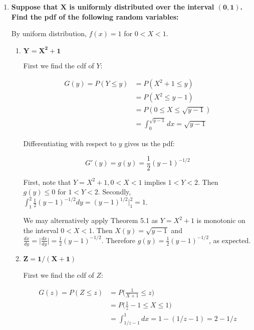 \documentclass[10pt, oneside]{article}   	%
\theoremstyle{definition}
\begin{document}
\begin{enumerate}[label=5.\arabic*]
\item  \begin{tcolorbox}[
  colback=Cerulean!5!white,
  colframe=Cerulean!75!black]
\textbf{Suppose that $\bm{X}$ is uniformly distributed over the interval $\bm{(0,1)}$. Find the pdf of the following random variables:}
\end{tcolorbox}

By uniform distribution, $f(x) = 1$ for $0 < X < 1$.

	\begin{enumerate}
	\item  \begin{tcolorbox}[
	  colback=Cerulean!5!white,
	  colframe=Cerulean!75!black]
	\textbf{$\bm{Y = X^2 + 1}$}
	\end{tcolorbox}
	
	First we find the cdf of $Y$:
	
	\begin{align*}
	G(y) = P(Y \leq y) &= P(X^2 + 1 \leq y) \\
	&= P(X^2 \leq y - 1) \\
	&= P(0 \leq X \leq \sqrt{y-1}) \\
	&= \int^{\sqrt{y-1}}_0 dx = \sqrt{y-1}
	\end{align*}
	
	Differentiating with respect to $y$ gives us the pdf:
	
	\[ G'(y) = g(y) = \boxed{ \frac{1}{2} (y - 1)^{-1/2} } \]
	
	First, note that $Y = X^2 + 1, 0 < X < 1$ implies $1 < Y < 2$. Then $g(y) \leq 0$ for $1 < Y < 2$. Secondly, $\int^2_1 \frac{1}{2} (y-1)^{-1/2} dy = (y-1)^{1/2} \big|^2_1 = \boxed{1}$.
	
	We may alternatively apply Theorem 5.1 as $Y = X^2 + 1$ is monotonic on the interval $0 < X < 1$. Then $X(y) = \sqrt{y - 1}$ and $\frac{dx}{dy} = \big| \frac{dx}{dy} \big| = \frac{1}{2} (y-1)^{-1/2}$. Therefore $g(y) = \frac{1}{2} (y-1)^{-1/2}$, as expected.
	
	\item  \begin{tcolorbox}[
	  colback=Cerulean!5!white,
	  colframe=Cerulean!75!black]
	\textbf{$\bm{Z = 1 / (X + 1)}$}
	\end{tcolorbox}
	
	First we find the cdf of $Z$:
	
	\begin{align*}
	G(z) = P(Z \leq z) &= P \Big( \frac{1}{X + 1} \leq z \Big) \\
	&= P \Big( \frac{1}{z} - 1 \leq X \leq 1 \Big) \\
	&= \int^1_{1/z - 1} dx = 1 - (1/z - 1) = 2 - 1/z
	\end{align*}
	

\end{enumerate}
\end{enumerate}
\end{document}
